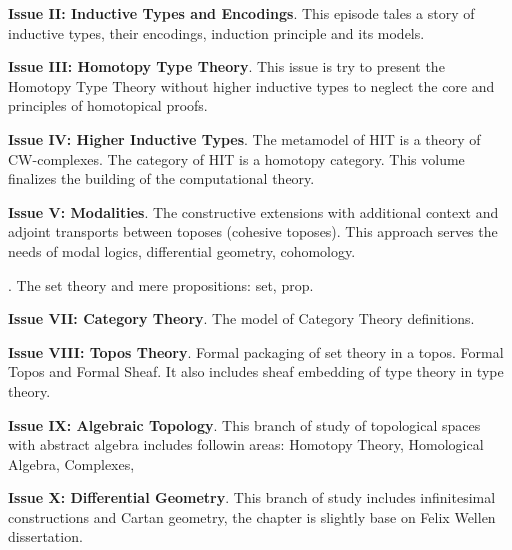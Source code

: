 \documentclass{article}
\theoremstyle{definition}
\begin{document}
{\bf Issue II: Inductive Types and Encodings}.
This episode tales a story of inductive types, their encodings,
induction principle and its models.

{\bf Issue III: Homotopy Type Theory}.
This issue is try to present the Homotopy Type Theory without higher inductive types
to neglect the core and principles of homotopical proofs.

{\bf Issue IV: Higher Inductive Types}.
The metamodel of HIT is a theory of CW-complexes. The category of HIT is a homotopy category.
This volume finalizes the building of the computational theory.

{\bf Issue V: Modalities}. The constructive extensions with additional context and
adjoint transports between toposes (cohesive toposes). This approach serves the needs
of modal logics, differential geometry, cohomology.




.
The set theory and mere propositions: set, prop.

{\bf Issue VII: Category Theory}.
The model of Category Theory definitions.

{\bf Issue VIII: Topos Theory}.
Formal packaging of set theory in a topos. Formal Topos and Formal Sheaf.
It also includes sheaf embedding of type theory in type theory.

{\bf Issue IX: Algebraic Topology}. This branch of study of topological spaces with abstract algebra
includes followin areas: Homotopy Theory, Homological Algebra, Complexes,

{\bf Issue X: Differential Geometry}. This branch of study includes
infinitesimal constructions and Cartan geometry, the chapter is
slightly base on Felix Wellen dissertation.
\end{document}
